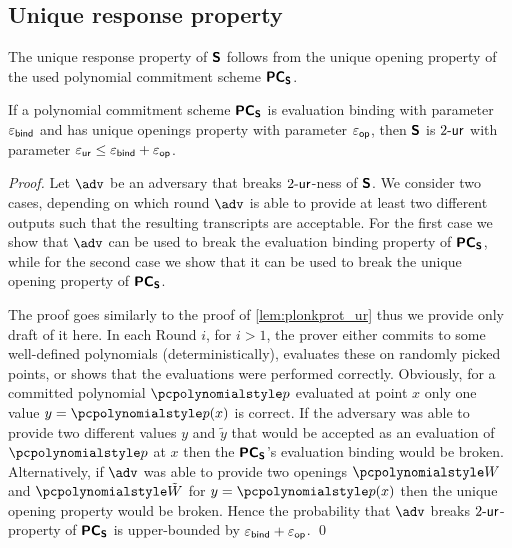 \documentclass[runningheads,10pt]{llncs}
\begin{document}
\subsection{Unique response property}
The unique response property of $\bm{\mathsf{S}}$ follows from the unique opening
property of the used polynomial commitment scheme $\bm{\mathsf{PC}}_{\bm{\mathsf{S}}}$.
\begin{lemma}
\label{lem:sonicprot_ur}
If a polynomial commitment scheme $\bm{\mathsf{PC}}_{\bm{\mathsf{S}}}$ is evaluation binding with
parameter $\varepsilon_{\mathsf{bind}}$ and has unique openings property with parameter
$\varepsilon_{\mathsf{op}}$, then $\bm{\mathsf{S}}$ is ${2\text{-}\mathsf{ur}}$ with parameter $\varepsilon_{\mathsf{ur}} \leq
\varepsilon_{\mathsf{bind}} + \varepsilon_{\mathsf{op}}$.  
\end{lemma}
\begin{proof}
  Let $\adv$ be an adversary that breaks ${2\text{-}\mathsf{ur}}$-ness of $\bm{\mathsf{S}}$.  We
  consider two cases, depending on which round $\adv$ is able to provide at
  least two different outputs such that the resulting transcripts are
  acceptable.  For the first case we show that $\adv$ can be used to break the
  evaluation binding property of $\bm{\mathsf{PC}}_{\bm{\mathsf{S}}}$, while for the second case we show
  that it can be used to break the unique opening property of $\bm{\mathsf{PC}}_{\bm{\mathsf{S}}}$.

  The proof goes similarly to the proof of \cref{lem:plonkprot_ur} thus we
  provide only draft of it here.  In each Round $i$, for $i > 1$, the prover
  either commits to some well-defined polynomials (deterministically), evaluates
  these on randomly picked points, or shows that the evaluations were performed
  correctly.  Obviously, for a committed polynomial $\p{p}$ evaluated at point
  $x$ only one value $y = \p{p}(x)$ is correct. If the adversary was able to
  provide two different values $y$ and $\tilde{y}$ that would be accepted as an
  evaluation of $\p{p}$ at $x$ then the $\bm{\mathsf{PC}}_{\bm{\mathsf{S}}}$'s evaluation binding would be
  broken.  Alternatively, if $\adv$ was able to provide two openings $\p{W}$ and
  $\p{\tilde{W}}$ for $y = \p{p}(x)$ then the unique opening property would be
  broken.
%
Hence the probability that $\adv$ breaks ${2\text{-}\mathsf{ur}}$-property of $\bm{\mathsf{PC}}_{\bm{\mathsf{S}}}$ is
upper-bounded by $\varepsilon_{\mathsf{bind}} + \varepsilon_{\mathsf{op}}$. 
\qed

\end{proof}
\end{document}

